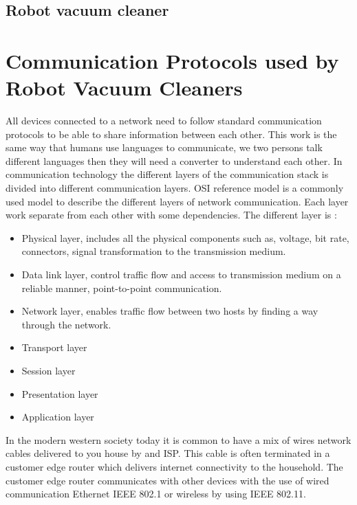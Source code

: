 \subsection{Robot vacuum cleaner}

\section{Communication Protocols used by Robot Vacuum Cleaners}

All devices connected to a network need to follow standard communication protocols to be able to share information between each other. This work is the same way that humans use languages to communicate, we two persons talk different languages then they will need a converter to understand each other. In communication technology the different layers of the communication stack is divided into different communication layers. OSI reference model \cite{osimodel} is a commonly used model to describe the different layers of network communication. Each layer work separate from each other with some dependencies. The different layer is \cite{osimodel}: 
\begin{itemize}
    \item Physical layer, includes all the physical components such as, voltage, bit rate, connectors, signal transformation to the transmission medium. 
    \item Data link layer, control traffic flow and access to transmission medium on a reliable manner, point-to-point communication. 
    \item Network layer, enables traffic flow between two hosts by finding a way through the network. 
    \item Transport layer 
    \item Session layer 
    \item Presentation layer 
    \item Application layer
    \ite
\end{itemize}
In the modern western society today it is common to have a mix of wires network cables delivered to you house by and ISP. This cable is often terminated in a customer edge router which delivers internet connectivity to the household. The customer edge router communicates with other devices with the use of wired communication Ethernet IEEE 802.1 or wireless by using IEEE 802.11. 

